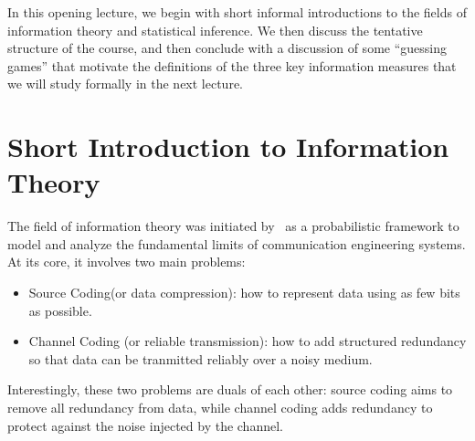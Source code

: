 \documentclass[12pt]{article}
\begin{document}
	\MakeScribeTop

In this opening lecture, we begin with short informal introductions to the fields of information theory and statistical inference. We then discuss the tentative structure of the course, and then conclude with a discussion of some ``guessing games'' that motivate the definitions of the three key information measures that we will study formally in the next lecture. 


\section{Short Introduction to Information Theory}
\label{section:short-intro-information-theory}

The field of information theory was initiated by~\citet{shannon1948mathematical} as a probabilistic framework to model and analyze the fundamental limits of communication engineering systems. At its core, it involves two main problems:
\begin{itemize}
\item Source Coding(or data compression): how to represent data using as few bits as possible. 
\item Channel Coding (or reliable transmission): how to add structured redundancy so that data can be tranmitted reliably over a noisy medium. 
\end{itemize}
Interestingly, these two problems are duals of each other: source coding aims to remove all redundancy from data, while channel coding adds redundancy to protect against the noise injected by the channel. 
\end{document}
